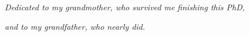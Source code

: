 \chapter*{}
\label{ch:dedication}

\centering

\vspace{12em}

\noindent \textit{Dedicated to my grandmother, who survived me finishing this PhD,}

\medskip 

\noindent \textit{and to my grandfather, who nearly did.}

\vfill